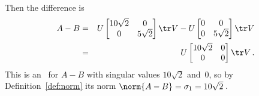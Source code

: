 \begin{example}
\begin{enumerate}
\begin{itemize}
\begin{solution}
\begin{eqnarray*}
\end{eqnarray*}
Then the difference is
\begin{eqnarray*}
A-B&=&U\begin{bmatrix} 10\sqrt2&0\\0&5\sqrt2 \end{bmatrix}\tr V
-U\begin{bmatrix} 0&0\\0&5\sqrt2 \end{bmatrix}\tr V
\\&=&U\begin{bmatrix} 10\sqrt2&0\\0&0 \end{bmatrix}\tr V\,.
\end{eqnarray*}
This is an \svd\ for \(A-B\) with singular values \(10\sqrt2\) and~\(0\), so by Definition~\ref{def:norm} its norm \(\norm{A-B}=\sigma_1=10\sqrt2\)\,.
\end{solution}


\end{itemize}
\end{enumerate}
\end{example}
